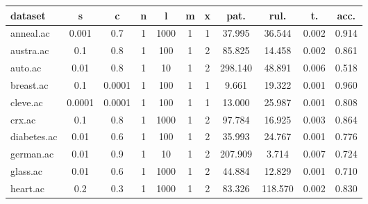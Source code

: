 \begin{table}[htbp]
	\centering
		\begin{tabular}{|l|c|c|c|c|c|c||c|c|c|c|}
		\hline
		\textbf{dataset}	& \textbf{s}	& \textbf{c}	& \textbf{n}	& \textbf{l}	& \textbf{m}	& \textbf{x}	& \textbf{pat.}	& \textbf{rul.}	& \textbf{t.}	& \textbf{acc.}	\\
		\hline
		anneal.ac      & 0.001    & 0.7         & 1              & 1000                & 1             & 1             & 37.995         & 36.544         & 0.002          & 0.914          \\
		\hline
		austra.ac      & 0.1      & 0.8         & 1              & 100                 & 1             & 2             & 85.825         & 14.458         & 0.002          & 0.861          \\
		\hline
		auto.ac        & 0.01     & 0.8         & 1              & 10                  & 1             & 2             & 298.140        & 48.891         & 0.006          & 0.518          \\
		\hline
		breast.ac      & 0.1      & 0.0001      & 1              & 100                 & 1             & 1             & 9.661          & 19.322         & 0.001          & 0.960          \\
		\hline
		cleve.ac       & 0.0001   & 0.0001      & 1              & 100                 & 1             & 1             & 13.000         & 25.987         & 0.001          & 0.808          \\
		\hline
		crx.ac         & 0.1      & 0.8         & 1              & 1000                & 1             & 2             & 97.784         & 16.925         & 0.003          & 0.864          \\
		\hline
		diabetes.ac    & 0.01     & 0.6         & 1              & 100                 & 1             & 2             & 35.993         & 24.767         & 0.001          & 0.776          \\
		\hline
		german.ac      & 0.01     & 0.9         & 1              & 10                  & 1             & 2             & 207.909        & 3.714          & 0.007          & 0.724          \\
		\hline
		glass.ac       & 0.01     & 0.6         & 1              & 1000                & 1             & 2             & 44.884         & 12.829         & 0.001          & 0.710          \\
		\hline
		heart.ac       & 0.2      & 0.3         & 1              & 1000                & 1             & 2             & 83.326         & 118.570        & 0.002          & 0.830          \\

\end{tabular}
\end{table}
